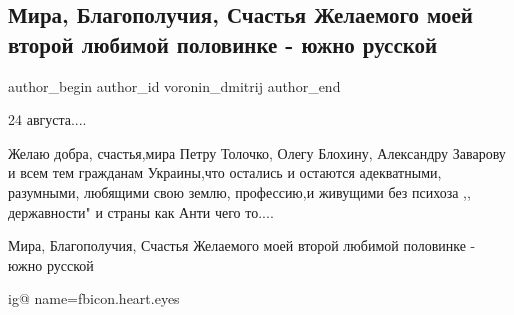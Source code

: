  
 
 
 
 
 
\subsection{Мира, Благополучия, Счастья Желаемого моей второй любимой половинке - южно русской}
\label{sec:24_08_2021.fb.voronin_dmitrij.1.nezalezhnist_pozdravlenie}
 
\ifcmt
 author_begin
   author_id voronin_dmitrij
 author_end
\fi

24 августа....

Желаю добра, счастья,мира Петру Толочко, Олегу Блохину, Александру Заварову и
всем тем гражданам Украины,что остались и остаются адекватными, разумными,
любящими свою землю, профессию,и живущими без психоза ,, державности" и страны
как Анти чего то....

Мира, Благополучия, Счастья Желаемого моей второй любимой половинке - южно
русской 

\ifcmt
  ig@ name=fbicon.heart.eyes
\fi

